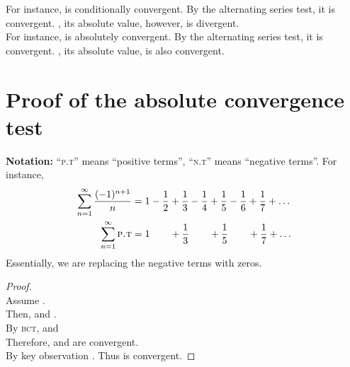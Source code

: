 For instance,  is conditionally convergent. By the alternating series test, it is convergent. , its absolute value, however, is divergent. \\
For instance,  is absolutely convergent. By the alternating series test, it is convergent. , its absolute value, is also convergent.

\newpage
\section{Proof of the absolute convergence test}
\textbf{Notation:} ``\textsc{p.t}'' means ``positive terms'', ``\textsc{n.t}'' means ``negative terms''. For instance, \begin{align*}
  \sum_{n = 1}^{\infty} \frac{(-1)^{n+1}}{n} & = 1 - \frac{1}{2} + \frac{1}{3} - \frac{1}{4} + \frac{1}{5} - \frac{1}{6} + \frac{1}{7} + \dots \\
  \sum_{n = 1}^{\infty} \text{\textsc{p.t}}  & = 1 \qquad + \frac{1}{3} \qquad + \frac{1}{5} \qquad + \frac{1}{7} + \dots                      \\
\end{align*}
Essentially, we are replacing the negative terms with zeros.
\begin{proof}~\\
  Assume . \\
  Then,  and . \\
  By \textsc{bct},  and  \\
  Therefore,  and  are convergent.  \\
  By key observation . Thus  is convergent.
\end{proof}



\newpage
